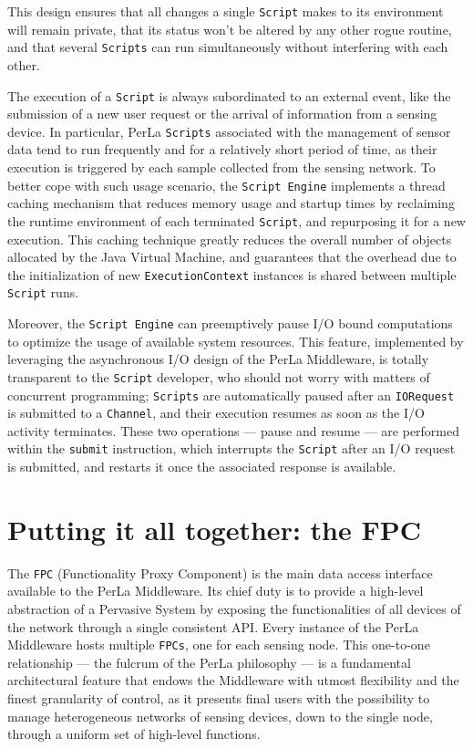 This design ensures that all changes a single \texttt{Script} makes to its
environment will remain private, that its status won't be altered by any
other rogue routine, and that several \texttt{Scripts} can run simultaneously
without interfering with each other.

The execution of a \texttt{Script} is always subordinated to an external event,
like the submission of a new user request or the arrival of information from a
sensing device. In particular, PerLa \texttt{Scripts} associated with the
management of sensor data tend to run frequently and for a relatively short
period of time, as their execution is triggered by each sample collected from
the sensing network. To better cope with such usage scenario, the
\texttt{Script Engine} implements a thread caching mechanism that reduces
memory usage and startup times by reclaiming the runtime environment of each
terminated \texttt{Script}, and repurposing it for a new execution. This
caching technique greatly reduces the overall number of objects allocated by
the Java Virtual Machine, and guarantees that the overhead due to the
initialization of new \texttt{ExecutionContext} instances is shared between
multiple \texttt{Script} runs.

Moreover, the \texttt{Script Engine} can preemptively pause I/O bound
computations to optimize the usage of available system resources. This feature,
implemented by leveraging the asynchronous I/O design of the PerLa Middleware,
is totally transparent to the \texttt{Script} developer, who should not worry
with matters of concurrent programming; \texttt{Scripts} are automatically
paused after an \texttt{IORequest} is submitted to a \texttt{Channel}, and
their execution resumes as soon as the I/O activity terminates. These
two operations --- pause and resume --- are performed within the
\texttt{submit} instruction, which interrupts the \texttt{Script} after
an I/O request is submitted, and restarts it once the associated response is
available.


\section{Putting it all together: the FPC}
\label{sec:components.fpc}

The \texttt{FPC} (Functionality Proxy Component) is the main data access
interface available to the PerLa Middleware. Its chief duty is to provide a
high-level abstraction of a Pervasive System by exposing the functionalities of
all devices of the network through a single consistent API. Every instance of
the PerLa Middleware hosts multiple \texttt{FPCs}, one for each sensing node.
This one-to-one relationship --- the fulcrum of the PerLa philosophy --- is a
fundamental architectural feature that endows the Middleware with utmost
flexibility and the finest granularity of control, as it presents final users
with the possibility to manage heterogeneous networks of sensing devices, down
to the single node, through a uniform set of high-level functions.

